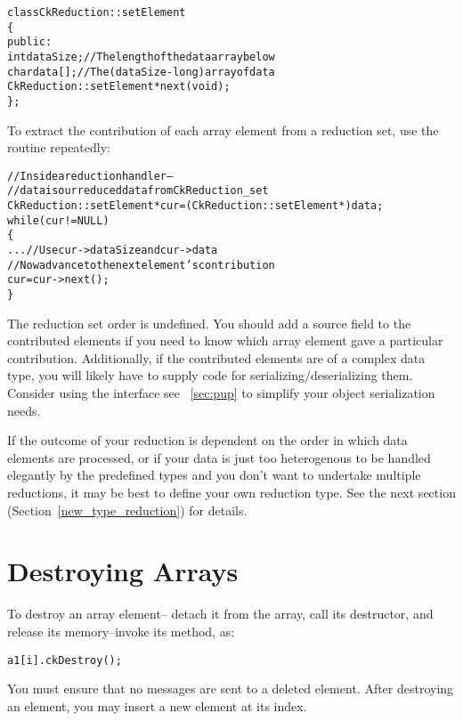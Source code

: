 \begin{alltt}
class CkReduction::setElement 
\{
public:
  int dataSize;//The length of the data array below
  char data[];//The (dataSize-long) array of data
  CkReduction::setElement *next(void);
\};
\end{alltt}

To extract the contribution of each array element from a reduction set, use the
 routine repeatedly:

\begin{alltt}
  //Inside a reduction handler-- 
  //  data is our reduced data from CkReduction_set
  CkReduction::setElement *cur=(CkReduction::setElement *)data;
  while (cur!=NULL)
  \{
    ... //Use cur->dataSize and cur->data
    //Now advance to the next element's contribution
    cur=cur->next();
  \}
\end{alltt}

The reduction set order is undefined.  You should add a source field to the
contributed elements if you need to know which array element gave a particular
contribution.  Additionally, if the contributed elements are of a complex 
data type, you will likely have to supply code for 
serializing/deserializing them.
Consider using the 
interface see ~\ref{sec:pup} to simplify your object serialization
needs.

If the outcome of your reduction is dependent on the order in which 
data elements are processed, or if your data is just too
heterogenous to be handled elegantly by the predefined types and you
don't want to undertake multiple reductions, it may be best to define
your own reduction type.  See the next section
(Section~\ref{new_type_reduction}) for details.

\section{Destroying Arrays}

To destroy an array element-- detach it from the array,
call its destructor, and release its memory--invoke its 
 method, as:

\begin{alltt}
a1[i].ckDestroy();
\end{alltt}

You must ensure that no messages are sent to a deleted element. 
After destroying an element, you may insert a new element at
its index.
